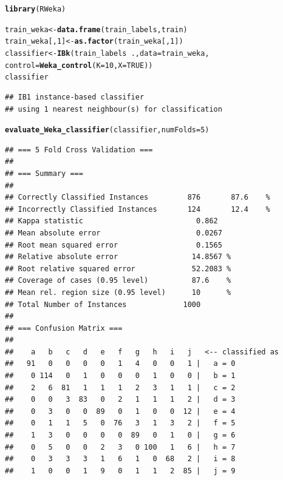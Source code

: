 \documentclass[final,pdftex]{../../template/epsilonj}\usepackage[]{graphicx}\usepackage[]{color}
\makeatletter
\newcommand{\hlnum}[1]{\textcolor[rgb]{0.686,0.059,0.569}{#1}}%
\newcommand{\hlopt}[1]{\textcolor[rgb]{0,0,0}{#1}}%
\newcommand{\hlstd}[1]{\textcolor[rgb]{0.345,0.345,0.345}{#1}}%
\newcommand{\hlkwb}[1]{\textcolor[rgb]{0.69,0.353,0.396}{#1}}%
\newcommand{\hlkwc}[1]{\textcolor[rgb]{0.333,0.667,0.333}{#1}}%
\newcommand{\hlkwd}[1]{\textcolor[rgb]{0.737,0.353,0.396}{\textbf{#1}}}%
\newenvironment{kframe}{%
 \def\at@end@of@kframe{}%
 \ifinner\ifhmode%
  \def\at@end@of@kframe{\end{minipage}}%
  \begin{minipage}{\columnwidth}%
 \fi\fi%
 \def\FrameCommand##1{\hskip\@totalleftmargin \hskip-\fboxsep
 \colorbox{shadecolor}{##1}\hskip-\fboxsep
     \hskip-\linewidth \hskip-\@totalleftmargin \hskip\columnwidth}%
 \MakeFramed {\advance\hsize-\width
   \@totalleftmargin\z@ \linewidth\hsize
   \@setminipage}}%
 {\par\unskip\endMakeFramed%
 \at@end@of@kframe}
\newenvironment{knitrout}{}{} %
\makeatother
\begin{document}
\begin{knitrout}
\color{fgcolor}\begin{kframe}
\begin{alltt}
\hlkwd{library}\hlstd{(RWeka)}

\hlstd{train_weka} \hlkwb{<-} \hlkwd{data.frame}\hlstd{(train_labels, train)}
\hlstd{train_weka[,}\hlnum{1}\hlstd{]} \hlkwb{<-} \hlkwd{as.factor}\hlstd{(train_weka[,}\hlnum{1}\hlstd{])}
\hlstd{classifier} \hlkwb{<-} \hlkwd{IBk}\hlstd{(train_labels}\hlopt{~}\hlstd{.,} \hlkwc{data} \hlstd{= train_weka,}
                  \hlkwc{control} \hlstd{=} \hlkwd{Weka_control}\hlstd{(}\hlkwc{K} \hlstd{=} \hlnum{10}\hlstd{,} \hlkwc{X}\hlstd{=}\hlnum{TRUE}\hlstd{))}
\hlstd{classifier}
\end{alltt}
\begin{verbatim}
## IB1 instance-based classifier
## using 1 nearest neighbour(s) for classification
\end{verbatim}
\begin{alltt}
\hlkwd{evaluate_Weka_classifier}\hlstd{(classifier,} \hlkwc{numFolds} \hlstd{=} \hlnum{5}\hlstd{)}
\end{alltt}
\begin{verbatim}
## === 5 Fold Cross Validation ===
## 
## === Summary ===
## 
## Correctly Classified Instances         876       87.6    %
## Incorrectly Classified Instances       124       12.4    %
## Kappa statistic                          0.862 
## Mean absolute error                      0.0267
## Root mean squared error                  0.1565
## Relative absolute error                 14.8567 %
## Root relative squared error             52.2083 %
## Coverage of cases (0.95 level)          87.6    %
## Mean rel. region size (0.95 level)      10      %
## Total Number of Instances             1000     
## 
## === Confusion Matrix ===
## 
##    a   b   c   d   e   f   g   h   i   j   <-- classified as
##   91   0   0   0   0   1   4   0   0   1 |   a = 0
##    0 114   0   1   0   0   0   1   0   0 |   b = 1
##    2   6  81   1   1   1   2   3   1   1 |   c = 2
##    0   0   3  83   0   2   1   1   1   2 |   d = 3
##    0   3   0   0  89   0   1   0   0  12 |   e = 4
##    0   1   1   5   0  76   3   1   3   2 |   f = 5
##    1   3   0   0   0   0  89   0   1   0 |   g = 6
##    0   5   0   0   2   3   0 100   1   6 |   h = 7
##    0   3   3   3   1   6   1   0  68   2 |   i = 8
##    1   0   0   1   9   0   1   1   2  85 |   j = 9
\end{verbatim}
\end{kframe}
\end{knitrout}
\end{document}
